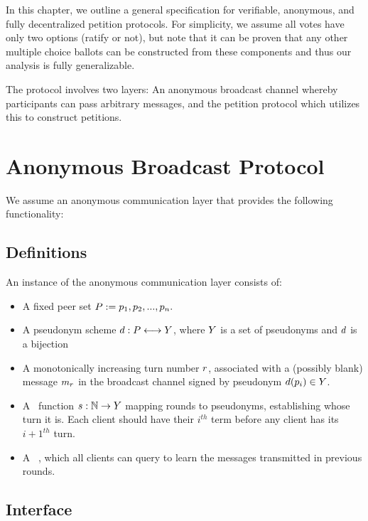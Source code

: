 In this chapter, we outline a general specification for verifiable, anonymous,
and fully decentralized petition protocols. For simplicity, we assume all votes
have only two options (ratify or not), but note that it can be proven that any
other multiple choice ballots can be constructed from these components and thus
our analysis is fully generalizable.

The protocol involves two layers: An anonymous broadcast channel whereby
participants can pass arbitrary messages, and the petition protocol which
utilizes this to construct petitions.
\section{Anonymous Broadcast Protocol}
We assume an anonymous communication layer that provides the following
functionality:

\subsection{Definitions}
An instance of the anonymous communication layer consists of:
\begin{itemize}
\item A fixed peer set
  $P:=p_{1},p_{2},...,p_{n}.$
\item A pseudonym scheme $d:P\longleftrightarrow Y$,
  where $Y$ is a set of pseudonyms and $d$ is a bijection
\item A monotonically increasing turn number $r$, associated with a
  (possibly blank) message $m_{r}$ in the broadcast channel signed by
  pseudonym $d(p_{i})\in Y$.
\item A \KwSchedule~function $s:\mathbb{N}\to Y$ mapping
  rounds to pseudonyms, establishing whose turn it is. Each client should have
  their $i^{th}$ term before any client has its $i+1^{th}$ turn.
\item A \HistoryOracle~, which all clients can query to learn the messages
  transmitted in previous rounds.
\end{itemize}

\subsection{Interface}

